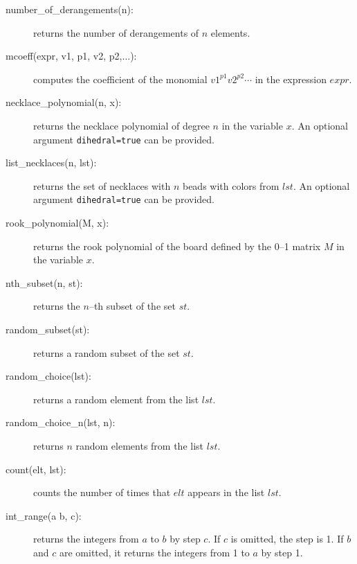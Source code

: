 \documentclass[11pt]{article}
\begin{document}
\begin{description}
  \item [number\_of\_derangements(n):] returns the number of
    derangements of $n$ elements.
  \item [mcoeff(expr, v1, p1, v2, p2,$\ldots$):] computes the
    coefficient of the monomial $v1^{p1}v2^{p2}\cdots$ in the
    expression $expr$.
  \item [necklace\_polynomial(n, x):] returns the necklace polynomial
    of degree $n$ in the variable $x$. An optional argument
    \texttt{dihedral=true} can be provided.
  \item [list\_necklaces(n, lst):] returns the set of necklaces with
    $n$ beads with colors from $lst$. An optional argument
    \texttt{dihedral=true} can be provided.
  \item [rook\_polynomial(M, x):] returns the rook polynomial of the
    board defined by the 0--1 matrix $M$ in the variable $x$.
  \item [nth\_subset(n, st):] returns the $n$--th subset of the set
    $st$.
  \item [random\_subset(st):] returns a random subset of the set $st$.
  \item [random\_choice(lst):] returns a random element from the list
    $lst$.
  \item [random\_choice\_n(lst, n):] returns $n$ random elements from
    the list $lst$.
  \item [count(elt, lst):] counts the number of times that $elt$
    appears in the list $lst$.
  \item [int\_range(a b, c):] returns the integers from $a$ to $b$ by
    step $c$. If $c$ is omitted, the step is 1. If $b$ and $c$ are
    omitted, it returns the integers from 1 to $a$ by step 1.
\end{description}
\end{document}
